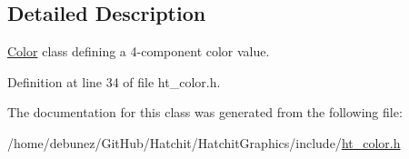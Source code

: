 \subsection{Detailed Description}
\hyperlink{classHatchit_1_1Graphics_1_1Color}{Color} class defining a 4-\/component color value. 

Definition at line 34 of file ht\+\_\+color.\+h.



The documentation for this class was generated from the following file\+:\begin{DoxyCompactItemize}
\item 
/home/debunez/\+Git\+Hub/\+Hatchit/\+Hatchit\+Graphics/include/\hyperlink{ht__color_8h}{ht\+\_\+color.\+h}\end{DoxyCompactItemize}
